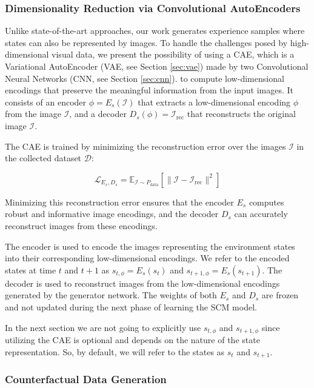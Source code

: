 \subsubsection{Dimensionality Reduction via Convolutional AutoEncoders}

Unlike state-of-the-art approaches, our work generates experience samples
where states can also be represented by images. To handle the challenges posed
by high-dimensional visual data, we present the possibility of using a CAE,
which is a Variational AutoEncoder (VAE, see Section \ref{sec:vae})
made by two Convolutional Neural Networks (CNN, see Section \ref{sec:cnn}).
to compute low-dimensional encodings that preserve the meaningful
information from the input images.
It consists of an encoder \( \phi = E_s(\mathcal{I}) \)
that extracts a low-dimensional encoding \( \phi \)
from the image \( \mathcal{I} \), and a decoder
\( D_s(\phi) = \mathcal{I}_{\text{rec}} \)
that reconstructs the original image \( \mathcal{I} \).

The CAE is trained by minimizing the reconstruction error over
the images \( \mathcal{I} \) in the collected dataset \( \mathcal{D} \):

\begin{equation}
\mathcal{L}_{E_s, D_s} = \mathbb{E}_{\mathcal{I} \sim P_{\text{data}}}
\left[ \| \mathcal{I} - \mathcal{I}_{\text{rec}} \|^2 \right]
\end{equation}

Minimizing this reconstruction error ensures that the encoder \( E_s \)
computes robust and informative image encodings, and the decoder \( D_s \)
can accurately reconstruct images from these encodings.

The encoder is used to encode the images representing the environment
states into their corresponding low-dimensional encodings.
We refer to the encoded states at time \( t \) and \( t+1 \) as
\( s_{t,\phi} = E_s(s_t) \) and \( s_{t+1,\phi} = E_s(s_{t+1}) \).
The decoder is used to reconstruct images from the low-dimensional
encodings generated by the generator network. The weights of both
\( E_s \) and \( D_s \) are frozen and not updated during the next
phase of learning the SCM model.

In the next section we are not going to explicitly use
\( s_{t,\phi} \) and \( s_{t+1,\phi} \) since utilizing the
CAE is optional and depends on the nature of the state representation.
So, by default, we will refer to the states as \( s_t \) and \( s_{t+1} \).

\subsubsection{Counterfactual Data Generation}

